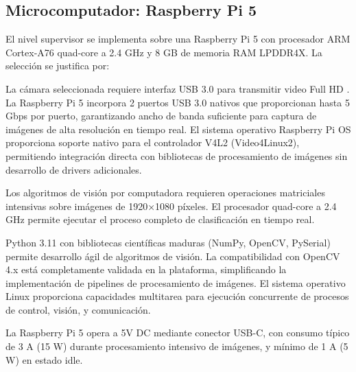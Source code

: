 \subsection{Microcomputador: Raspberry Pi 5}

El nivel supervisor se implementa sobre una Raspberry Pi 5 con procesador ARM Cortex-A76 quad-core a 2.4 GHz y 8 GB de memoria RAM LPDDR4X. La selección se justifica por:

La cámara seleccionada requiere interfaz USB 3.0 para transmitir video Full HD . La Raspberry Pi 5 incorpora 2 puertos USB 3.0 nativos que proporcionan hasta 5 Gbps por puerto, garantizando ancho de banda suficiente para captura de imágenes de alta resolución en tiempo real. El sistema operativo Raspberry Pi OS proporciona soporte nativo para el controlador V4L2 (Video4Linux2), permitiendo integración directa con bibliotecas de procesamiento de imágenes sin desarrollo de drivers adicionales.

Los algoritmos de visión por computadora requieren operaciones matriciales intensivas sobre imágenes de 1920×1080 píxeles. El procesador quad-core a 2.4 GHz permite ejecutar el proceso completo de clasificación en tiempo real.

 Python 3.11 con bibliotecas científicas maduras (NumPy, OpenCV, PySerial) permite desarrollo ágil de algoritmos de visión. La compatibilidad con OpenCV 4.x está completamente validada en la plataforma, simplificando la implementación de pipelines de procesamiento de imágenes. El sistema operativo Linux proporciona capacidades multitarea para ejecución concurrente de procesos de control, visión, y comunicación.

La Raspberry Pi 5 opera a 5V DC mediante conector USB-C, con consumo típico de 3 A (15 W) durante procesamiento intensivo de imágenes, y mínimo de 1 A (5 W) en estado idle.
